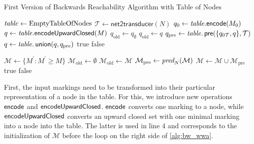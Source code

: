 \begin{algorithm}[htb]
\caption{First Version of Backwards Reachability Algorithm with Table of Nodes}\label{alg:bw_wwa}
\begin{minipage}[t]{0.6\textwidth}
\begin{algorithmic}[1]
\State $\mathit{table} \gets \text{EmptyTableOfNodes}$
\State $\mathcal{T} \gets \textsf{net2transducer}(N)$
\State $q_{0} \gets  \mathit{table}.\textsf{encode}(M_{0})$
\State $q \gets \mathit{table}.\textsf{encodeUpwardClosed}(M)$
\State $q_{\text{old}} \gets q_{\emptyset}$
	\State $q_{\text{old}}  \gets q$
	\State $q_{\text{pre}} \gets \mathit{table}.\operatorname{\textsf{pre}}(\{q_{0\mathcal{T}},q\},\mathcal{T})$
	\State $q \gets \mathit{table}.\operatorname{\textsf{union}}(q, q_{\text{pre}})$
	\Return true
\EndIf
{}
    \Return false
\EndIf
\EndWhile
\end{algorithmic}
\end{minipage}
\begin{algocolor}
\begin{minipage}[t]{0.37\textwidth}
\begin{algorithmic}
\State 
\State 
\State 
\State $\mathcal{M} \gets \{ M^{'} : M^{'} \ge M \}$
\State $\mathcal{M}_{\text{old}} \gets \emptyset$
	\State $\mathcal{M}_{\text{old}} \gets \mathcal{M}$
	\State $\mathcal{M}_{\text{pre}} \gets \operatorname{\textit{pred}}_{N}(\mathcal{M})$
	\State $\mathcal{M} \gets \mathcal{M}  \cup \mathcal{M}_{\text{pre}}$
	\Return true
\EndIf
{}
    \Return false
\EndIf
\EndWhile
\end{algorithmic}
\end{minipage}
\end{algocolor}
\end{algorithm}

First, the input markings need to be transformed into their particular representation of a node in the table.
For this, we introduce new operations $\operatorname{\textsf{encode}}$ and $\operatorname{\textsf{encodeUpwardClosed}}$. $\operatorname{\textsf{encode}}$ converts one marking to a node, while $\operatorname{\textsf{encodeUpwardClosed}}$ converts an upward closed set with one minimal marking into a node into the table. The latter is used in line 4 and corresponds to the initialization of $\mathcal{M}$ before the loop on the right side of \autoref{alg:bw_wwa}.

\par

